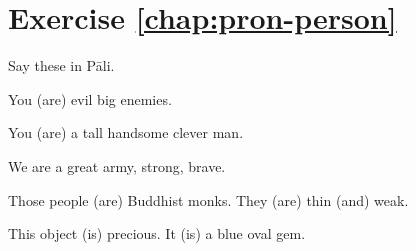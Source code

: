 \enlargethispage{\baselineskip}
\section*{Exercise \ref{chap:pron-person}}
Say these in P\=ali.
\begin{compactenum}
\item You (are) evil big enemies.
\item You (are) a tall handsome clever man.
\item We are a great army, strong, brave.
\item Those people (are) Buddhist monks. They (are) thin (and) weak.
\item This object (is) precious. It (is) a blue oval gem.
\end{compactenum}
